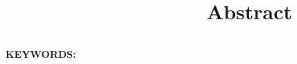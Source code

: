 %
% 

\chapter*{\ \ \ \ \ \ \ \ \ \ \ \ \ \ \ \ \ \ Abstract}\thispagestyle{empty}

%


$ $

\textbf{KEYWORDS:}

%
%